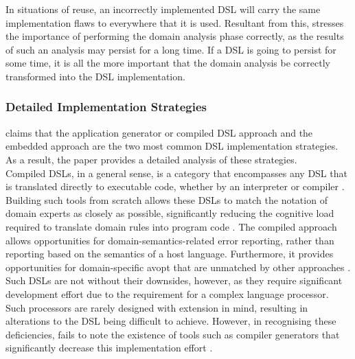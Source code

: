 In situations of reuse, an incorrectly implemented DSL will carry the same implementation flaws to everywhere that it is used.
Resultant from this, \citet{Mernik:2005:DDL:1118890.1118892} stresses the importance of performing the domain analysis phase correctly, as the results of such an analysis may persist for a long time. 
If a DSL is going to persist for some time, it is all the more important that the domain analysis be correctly transformed into the DSL implementation. 


\subsubsection{Detailed Implementation Strategies} %
\label{ssub:detailed_implementation_strategies}
\citet{Mernik:2005:DDL:1118890.1118892} claims that the application generator or compiled DSL approach and the embedded approach are the two most common DSL implementation strategies. 
As a result, the paper provides a detailed analysis of these strategies. \\

Compiled DSLs, in a general sense, is a category that encompasses any DSL that is translated directly to executable code, whether by an interpreter or compiler \citep{Mernik:2005:DDL:1118890.1118892}. 
Building such tools from scratch allows these DSLs to match the notation of domain experts as closely as possible, significantly reducing the cognitive load required to translate domain rules into program code \citep{fowler2010domain}.
The compiled approach allows opportunities for domain-semantics-related error reporting, rather than reporting based on the semantics of a host language.
Furthermore, it provides opportunities for domain-specific \gls{avopt} that are unmatched by other approaches \citep{Mernik:2005:DDL:1118890.1118892}.\\

Such DSLs are not without their downsides, however, as they require significant development effort due to the requirement for a complex language processor. 
Such processors are rarely designed with extension in mind, resulting in alterations to the DSL being difficult to achieve. 
However, in recognising these deficiencies, \citet{Mernik:2005:DDL:1118890.1118892} fails to note the existence of tools such as compiler generators that significantly decrease this implementation effort \citep{Mandell:1966:MDA:800267.810785}. \\

